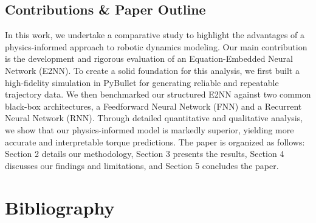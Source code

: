 \subsection{Contributions \& Paper Outline}
In this work, we undertake a comparative study to highlight the advantages of a physics-informed approach to robotic dynamics modeling. Our main contribution is the development and rigorous evaluation of an Equation-Embedded Neural Network (E2NN). To create a solid foundation for this analysis, we first built a high-fidelity simulation in PyBullet for generating reliable and repeatable trajectory data. We then benchmarked our structured E2NN against two common black-box architectures, a Feedforward Neural Network (FNN) and a Recurrent Neural Network (RNN). Through detailed quantitative and qualitative analysis, we show that our physics-informed model is markedly superior, yielding more accurate and interpretable torque predictions. The paper is organized as follows: Section 2 details our methodology, Section 3 presents the results, Section 4 discusses our findings and limitations, and Section 5 concludes the paper.

\section{Bibliography}

